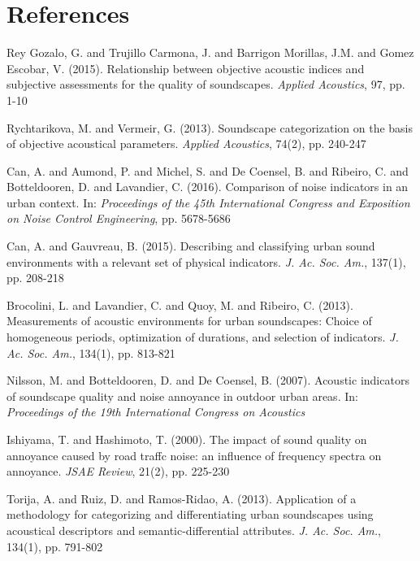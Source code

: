 \documentclass[final,3p,times,twocolumn]{elsarticle}
\begin{document}
\section{References}
\begin{thebibliography}{09}






Rey Gozalo, G. and Trujillo Carmona, J. and Barrigon Morillas, J.M. and Gomez Escobar, V. (2015). Relationship between objective acoustic indices and subjective assessments for the quality of soundscapes. \textit{Applied Acoustics}, 97, pp. 1-10

Rychtarikova, M. and Vermeir, G. (2013). Soundscape categorization on the basis of objective acoustical parameters. \textit{Applied Acoustics}, 74(2), pp. 240-247

Can, A. and Aumond, P. and Michel, S. and De Coensel, B. and Ribeiro, C. and Botteldooren, D. and Lavandier, C. (2016). Comparison of noise indicators in an urban context. In: \textit{Proceedings of the 45th International Congress and Exposition on Noise Control Engineering}, pp. 5678-5686

Can, A. and Gauvreau, B. (2015). Describing and classifying urban sound environments with a relevant set of physical indicators. \textit{J. Ac. Soc. Am.}, 137(1), pp. 208-218

Brocolini, L. and Lavandier, C. and Quoy, M. and Ribeiro, C. (2013). Measurements of acoustic environments for urban soundscapes: Choice of homogeneous periods, optimization of durations, and selection of indicators. \textit{J. Ac. Soc. Am.}, 134(1), pp. 813-821

Nilsson, M. and Botteldooren, D. and De Coensel, B. (2007). Acoustic indicators of soundscape quality and noise annoyance in outdoor urban areas. In: \textit{Proceedings of the 19th International Congress on Acoustics}

Ishiyama, T. and Hashimoto, T. (2000). The impact of sound quality on annoyance caused by road traffc noise: an influence of frequency spectra on annoyance. \textit{JSAE Review}, 21(2), pp. 225-230

Torija, A. and Ruiz, D. and Ramos-Ridao, A. (2013). Application of a methodology for categorizing and differentiating urban soundscapes using acoustical descriptors and semantic-differential attributes. \textit{J. Ac. Soc. Am.}, 134(1), pp. 791-802


\end{thebibliography}
\end{document}
